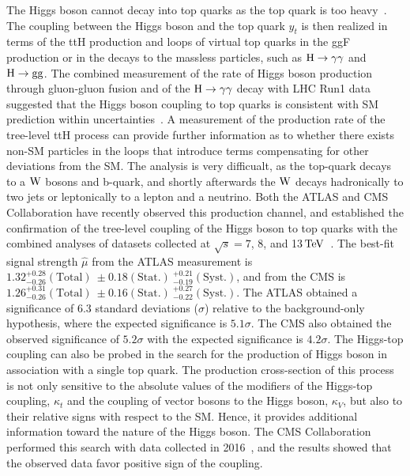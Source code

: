 The Higgs boson cannot decay into top quarks as the top quark is too heavy~\cite{LHCTOPWG}. The coupling between the Higgs boson and the top quark $y_{t}$ is then realized in terms of the ttH production and loops of virtual top quarks in the ggF production or in the decays to the massless particles, such as $\mathrm{H}\to\gamma\gamma$ and $\mathrm{H}\to\mathrm{g}\mathrm{g}$. The combined measurement of the rate of Higgs boson production through gluon-gluon fusion and of the $\mathrm{H}\to\gamma\gamma$ decay with LHC Run1 data suggested that the Higgs boson coupling to top quarks is consistent with SM prediction within uncertainties~\cite{Khachatryan:2016vau}. A measurement of the production rate of the tree-level ttH process can provide further information as to whether there exists non-SM particles in the loops that introduce terms compensating for other deviations from the SM. The analysis is very difficualt, as the top-quark decays to a $\mathrm{W}$ bosons and b-quark, and shortly afterwards the $\mathrm{W}$ decays hadronically to two jets or leptonically to a lepton and a neutrino. Both the ATLAS and CMS Collaboration have recently observed this production channel, and established the confirmation of the tree-level coupling of the Higgs boson to top quarks with the combined analyses of datasets collected at $\sqrt{s}=7$, 8, and 13$\,\text{Te\hspace{-.08em}V}$~\cite{Aaboud:2018urx,Sirunyan:2018hoz}. The best-fit signal strength $\hat{\mu}$ from the ATLAS measurement is $1.32^{+0.28}_{-0.26}(\text{Total})\ \pm 0.18(\text{Stat.})\ ^{+0.21}_{-0.19}(\text{Syst.})$, and from the CMS is $1.26^{+0.31}_{-0.26}(\text{Total})\ \pm 0.16(\text{Stat.})\ ^{+0.27}_{-0.22}(\text{Syst.})$. The ATLAS obtained a significance of 6.3 standard deviations ($\sigma$) relative to the background-only hypothesis, where the expected significance is $5.1\sigma$. The CMS also obtained the observed significance of $5.2\sigma$ with the expected significance is $4.2\sigma$. The Higgs-top coupling can also be probed in the search for the production of Higgs boson in association with a single top quark. The production cross-section of this process is not only sensitive to the absolute values of the modifiers of the Higgs-top coupling, $\kappa_{t}$ and the coupling of vector bosons to the Higgs boson, $\kappa_{V}$, but also to their relative signs with respect to the SM. Hence, it provides additional information toward the nature of the Higgs boson. The CMS Collaboration performed this search with data collected in 2016~\cite{CMS-PAS-HIG-18-009}, and the results showed that the observed data favor positive sign of the coupling.

